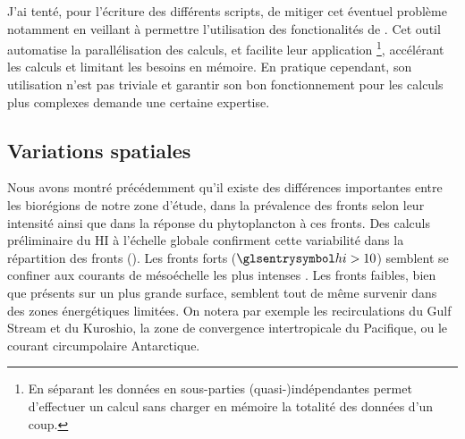 J'ai tenté, pour l'écriture des différents scripts, de mitiger cet éventuel problème notamment en veillant à permettre l'utilisation des fonctionalités de .
Cet outil automatise la parallélisation des calculs, et facilite leur application \footnote{%
  En séparant les données en sous-parties (quasi-)indépendantes  permet d'effectuer un calcul sans charger en mémoire la totalité des données d'un coup.
}, accélérant les calculs et limitant les besoins en mémoire.
En pratique cependant, son utilisation n'est pas triviale et garantir son bon fonctionnement pour les calculs plus complexes demande une certaine expertise.


\subsection{Variations spatiales}

Nous avons montré précédemment qu'il existe des différences importantes entre les biorégions de notre zone d'étude, dans la prévalence des fronts selon leur intensité ainsi que dans la réponse du phytoplancton à ces fronts.
Des calculs préliminaire du HI à l'échelle globale confirment cette variabilité dans la répartition des fronts ().
Les fronts forts (\(\am{hi}>10\)) semblent se confiner aux courants de mésoéchelle les plus intenses .
Les fronts faibles, bien que présents sur un plus grande surface, semblent tout de même survenir dans des zones énergétiques limitées.
On notera par exemple les recirculations du Gulf Stream et du Kuroshio, la zone de convergence intertropicale du Pacifique, ou le courant circumpolaire Antarctique.

\begin{figure}
  \centering
  \label{fig:global-fronts}
\end{figure}

